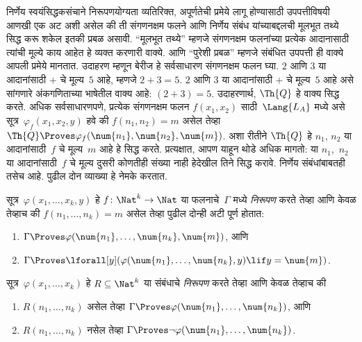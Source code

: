 निर्णेय स्वयंसिद्धकसंचाने निरूपणयोग्यता व्यतिरिक्त, अपूर्णतेची प्रमेये लागू होण्यासाठी
उपपत्तीविषयी आणखी एक अट अशी असेल की ती संगणनक्षम फलने आणि
निर्णेय संबंध यांच्याबद्दलची मूलभूत तथ्ये सिद्ध करू शकेल इतकी
प्रबळ असावी. ``मूलभूत तथ्ये'' म्हणजे संगणनक्षम फलनांच्या प्रत्येक
आदानासाठी त्यांची मूल्ये काय आहेत हे व्यक्त करणारी वाक्ये.
आणि ``पुरेशी प्रबळ'' म्हणजे संबंधित उपपत्ती ही वाक्ये आपली प्रमेये
मानतात. उदाहरण म्हणून बेरीज हे सर्वसाधारण संगणनक्षम फलन घ्या.
$2$ आणि $3$ या आदानांसाठी $+$ चे मूल्य~$5$ आहे, म्हणजे
$2+3 = 5$. $2$ आणि $3$ या आदानांसाठी $+$ चे मूल्य~$5$ आहे
असे सांगणारे अंकगणिताच्या भाषेतील वाक्य आहे:
$(\num{2} + \num{3}) = \num{5}$. उदाहरणार्थ, $\Th{Q}$ हे वाक्य
सिद्ध करते. अधिक सर्वसाधारणपणे, प्रत्येक संगणनक्षम फलन
$f(x_1, x_2)$ साठी~$\Lang{L_A}$ मध्ये असे सूत्र~$\varphi_f(x_1,
x_2, y)$ हवे की $f(n_1, n_2) = m$ असेल तेव्हा $\Th{Q}
\Proves \varphi_f(\num{n_1}, \num{n_2}, \num{m})$. अशा रीतीने
$\Th{Q}$ हे $n_1$, $n_2$ या आदानांसाठी~$f$ चे मूल्य~$m$
आहे हे सिद्ध करते. प्रत्यक्षात, आपण याहून थोडे अधिक मागतो:
या $n_1$,~$n_2$ या आदानांसाठी~$f$ चे मूल्य दुसरी कोणतीही संख्या नाही हेदेखील
तिने सिद्ध करावे. निर्णेय संबंधांबाबतही तसेच आहे. पुढील
दोन व्याख्या हे नेमके करतात.

\begin{defn}
सूत्र~$\varphi(x_1, \dots, x_k, y)$ हे
$f\colon \Nat^k \to \Nat$ या फलनाचे~$\Gamma$ मध्ये
\emph{निरूपण} करते तेव्हा आणि केवळ तेव्हाच की $f(n_1,
\dots, n_k) = m$ असेल तेव्हा पुढील दोन्ही अटी पूर्ण होतात:
\begin{enumerate}
\item $\Gamma \Proves \varphi(\num{n_1}, \dots, \num{n_k}, \num{m})$, आणि
\item $\Gamma \Proves \lforall[y](\varphi(\num{n_1}, \dots, \num{n_k},
y) \lif y = \num{m})$.
\end{enumerate}
\end{defn}

\begin{defn}
सूत्र~$\varphi(x_1, \dots, x_k)$ हे
$R \subseteq \Nat^k$ या संबंधाचे \emph{निरूपण} करते तेव्हा आणि केवळ तेव्हाच की
\begin{enumerate}
\item $R(n_1, \dots, n_k)$ असेल तेव्हा $\Gamma \Proves \varphi(\num{n_1},
\dots, \num{n_k})$, आणि
\item $R(n_1, \dots, n_k)$ नसेल तेव्हा $\Gamma \Proves \lnot
\varphi(\num{n_1}, \dots, \num{n_k})$.
\end{enumerate}
\end{defn}

